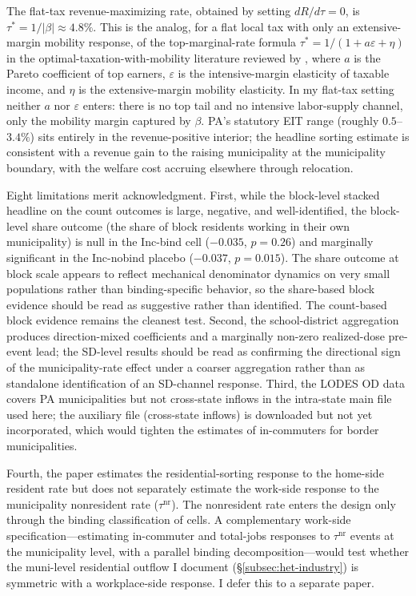 \documentclass[12pt]{article}
\begin{document}
The flat-tax revenue-maximizing rate, obtained by setting
$dR/d\tau = 0$, is $\tau^{\ast} = 1/|\beta| \approx 4.8\%$. This is
the analog, for a flat local tax with only an extensive-margin
mobility response, of the top-marginal-rate formula
$\tau^{\ast} = 1/(1 + a\varepsilon + \eta)$ in the optimal-taxation-with-mobility
literature reviewed by \citet{agrawalLessonsStateLocal}, where $a$
is the Pareto coefficient of top earners, $\varepsilon$ is the
intensive-margin elasticity of taxable income, and $\eta$ is the
extensive-margin mobility elasticity. In my flat-tax setting
neither $a$ nor $\varepsilon$ enters: there is no top tail and no
intensive labor-supply channel, only the mobility margin captured
by $\beta$. PA's statutory EIT range (roughly $0.5$--$3.4\%$) sits
entirely in the revenue-positive interior; the headline sorting
estimate is consistent with a revenue gain to the raising
municipality at the municipality boundary, with the welfare cost accruing
elsewhere through relocation.

Eight limitations merit acknowledgment. First, while the block-level
stacked headline on the count outcomes is large, negative, and
well-identified, the block-level share outcome
(the share of block residents working in their own municipality) is null in
the Inc-bind cell ($-0.035$, $p = 0.26$) and marginally significant
in the Inc-nobind placebo ($-0.037$, $p = 0.015$). The share outcome
at block scale appears to reflect mechanical denominator dynamics on
very small populations rather than binding-specific behavior,
so the share-based block evidence should be read as suggestive
rather than identified. The count-based block evidence remains the
cleanest test. Second, the school-district aggregation produces
direction-mixed coefficients and a marginally non-zero realized-dose
pre-event lead; the SD-level results should be read as confirming
the directional sign of the municipality-rate effect under a coarser
aggregation rather than as standalone identification of an
SD-channel response. Third, the LODES OD data covers PA
municipalities but not cross-state inflows in the intra-state main
file used here; the auxiliary file (cross-state inflows) is
downloaded but not yet incorporated, which would tighten the
estimates of in-commuters for border municipalities.

Fourth, the paper estimates the residential-sorting response to the
home-side resident rate but does not separately estimate the
work-side response to the municipality nonresident rate ($\tau^{\text{nr}}$).
The nonresident rate enters the design only through the
binding classification of cells. A complementary work-side
specification---estimating in-commuter and total-jobs responses to
$\tau^{\text{nr}}$ events at the municipality level, with a parallel
binding decomposition---would test whether the
muni-level residential outflow I document
(\S\ref{subsec:het-industry}) is symmetric with a workplace-side
response. I defer this to a separate paper.
\end{document}
